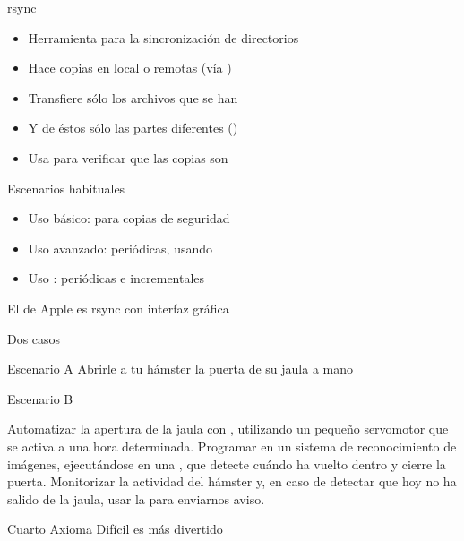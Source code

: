 \documentclass[14pt]{beamer}
\begin{document}
\begin{frame}{rsync}

  \begin{itemize} \itemsep0em
    \item Herramienta  para la sincronización
      de directorios
    \item Hace copias en local o remotas (vía )
    \item Transfiere sólo los archivos que se han 
    \item Y de éstos sólo las partes diferentes
      ()
    \item Usa  para verificar que las copias son
  \end{itemize}

  \begin{alertblock}{\centering \footnotesize Escenarios habituales}
    \begin{itemize} \itemsep0em
      \footnotesize
      \item Uso básico: para copias de seguridad
      \item Uso avanzado: periódicas, usando 
      \item Uso : periódicas e incrementales
    \end{itemize}
  \end{alertblock}

  \begin{block}{}
    \centering \small
    El  de Apple es rsync con interfaz gráfica
  \end{block}

\end{frame}

\begin{frame}{Dos casos}

  \begin{exampleblock}{Escenario A}\centering
   \small Abrirle a tu hámster la puerta de su jaula a mano
   \end{exampleblock}

  \begin{block}{Escenario B} \centering

    \small Automatizar la apertura de la jaula con
    , utilizando un pequeño servomotor que se
    activa a una hora determinada. Programar en  un
    sistema de reconocimiento de imágenes, ejecutándose en una
    , que detecte cuándo ha vuelto dentro y
    cierre la puerta. Monitorizar la actividad del hámster y, en caso
    de detectar que hoy no ha salido de la jaula, usar la
     para enviarnos aviso.
   \end{block}

  \begin{alertblock}{\centering Cuarto Axioma}
    \centering Difícil es más divertido
  \end{alertblock}

\end{frame}
\end{document}
